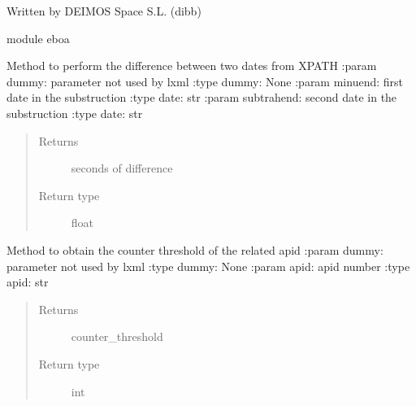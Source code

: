 Written by DEIMOS Space S.L. (dibb)

module eboa

\begin{fulllineitems}
\label{\detokenize{s2boa.ingestions:s2boa.ingestions.xpath_functions.dates_difference}}
Method to perform the difference between two dates from XPATH
:param dummy: parameter not used by lxml
:type dummy: None
:param minuend: first date in the substruction
:type date: str
:param subtrahend: second date in the substruction
:type date: str
\begin{quote}\begin{description}
\item[{Returns}] \leavevmode
seconds of difference

\item[{Return type}] \leavevmode
float

\end{description}\end{quote}

\end{fulllineitems}


\begin{fulllineitems}
\label{\detokenize{s2boa.ingestions:s2boa.ingestions.xpath_functions.get_counter_threshold_from_apid}}
Method to obtain the counter threshold of the related apid
:param dummy: parameter not used by lxml
:type dummy: None
:param apid: apid number
:type apid: str
\begin{quote}\begin{description}
\item[{Returns}] \leavevmode
counter\_threshold

\item[{Return type}] \leavevmode
int

\end{description}\end{quote}

\end{fulllineitems}

